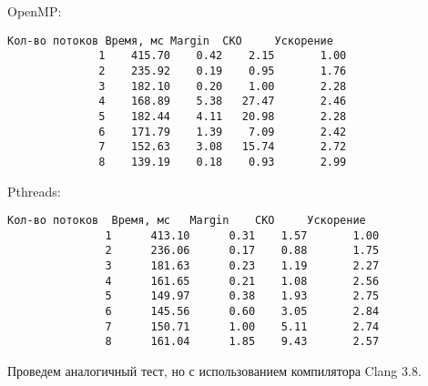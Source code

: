 \begin{figure}[H]
	\centering
	\caption{}
\end{figure}

OpenMP:
\begin{verbatim}
Кол-во потоков Время, мс Margin  СКО     Ускорение  
              1    415.70    0.42    2.15       1.00
              2    235.92    0.19    0.95       1.76
              3    182.10    0.20    1.00       2.28
              4    168.89    5.38   27.47       2.46
              5    182.44    4.11   20.98       2.28
              6    171.79    1.39    7.09       2.42
              7    152.63    3.08   15.74       2.72
              8    139.19    0.18    0.93       2.99
\end{verbatim}

Pthreads:
\begin{verbatim}
Кол-во потоков  Время, мс   Margin    СКО     Ускорение  
               1      413.10      0.31    1.57       1.00
               2      236.06      0.17    0.88       1.75
               3      181.63      0.23    1.19       2.27
               4      161.65      0.21    1.08       2.56
               5      149.97      0.38    1.93       2.75
               6      145.56      0.60    3.05       2.84
               7      150.71      1.00    5.11       2.74
               8      161.04      1.85    9.43       2.57
\end{verbatim}

\begin{figure}[H]
	\centering
	\caption{}
\end{figure}

Проведем аналогичный тест, но с использованием компилятора Clang 3.8.

\begin{figure}[H]
	\centering
	\caption{}
\end{figure}

\begin{figure}[H]
	\centering
	\caption{}
\end{figure}

\begin{figure}[H]
	\centering
	\caption{}
\end{figure}

